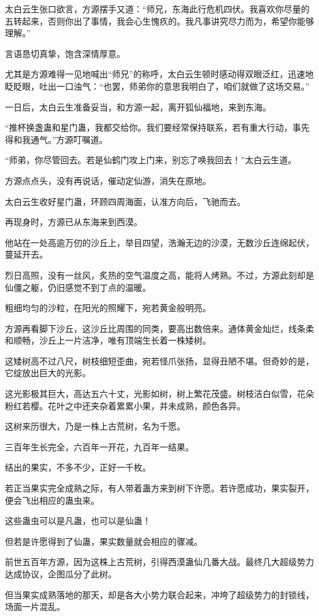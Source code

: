 \begin{this_body}
太白云生张口欲言，方源摆手又道：“师兄，东海此行危机四伏。我喜欢你尽量的五转起来，否则你出了事情，我会心生愧疚的。我凡事讲究尽力而为，希望你能够理解。”

言语恳切真挚，饱含深情厚意。

尤其是方源难得一见地喊出“师兄”的称呼，太白云生顿时感动得双眼泛红，迅速地眨眨眼，吐出一口浊气：“也罢，师弟你的意思我明白了，咱们就做了这场交易。”

一日后，太白云生准备妥当，和方源一起，离开狐仙福地，来到东海。

“推杯换盏蛊和星门蛊，我都交给你。我们要经常保持联系，若有重大行动，事先得和我通气。”方源叮嘱道。

“师弟，你尽管回去。若是仙鹤门攻上门来，别忘了唤我回去！”太白云生道。

方源点点头，没有再说话，催动定仙游，消失在原地。

太白云生收好星门蛊，环顾四周海面，认准方向后，飞驰而去。

再现身时，方源已从东海来到西漠。

他站在一处高逾万仞的沙丘上，举目四望，浩瀚无边的沙漠，无数沙丘连绵起伏，蔓延开去。

烈日高照，没有一丝风，炙热的空气温度之高，能将人烤熟。不过，方源此刻却是仙僵之躯，仍旧感觉不到丁点的温暖。

粗细均匀的沙粒，在阳光的照耀下，宛若黄金般明亮。

方源再看脚下沙丘，这沙丘比周围的同类，要高出数倍来。通体黄金灿烂，线条柔和顺畅，沙丘上一片洁净，唯有顶端生长着一株矮树。

这矮树高不过八尺，树枝细短歪曲，宛若怪爪张扬，显得丑陋不堪。但奇妙的是，它绽放出巨大的光影。

这光影极其巨大，高达五六十丈，光影如树，树上繁花茂盛。树枝洁白似雪，花朵粉红若樱。花叶之中还夹杂着累累小果，并未成熟，颜色各异。

这树来历很大，乃是一株上古荒树，名为千愿。

三百年生长完全，六百年一开花，九百年一结果。

结出的果实，不多不少，正好一千枚。

若正当果实完全成熟之际，有人带着蛊方来到树下许愿。若许愿成功，果实裂开，便会飞出相应的蛊虫来。

这些蛊虫可以是凡蛊，也可以是仙蛊！

但若是许愿得到了仙蛊，果实数量就会相应的骤减。

前世五百年方源，因为这株上古荒树，引得西漠蛊仙几番大战。最终几大超级势力达成协议，企图瓜分了此树。

但当果实成熟落地的那天，却是各大小势力联合起来，冲垮了超级势力的封锁线，场面一片混乱。


\end{this_body}
